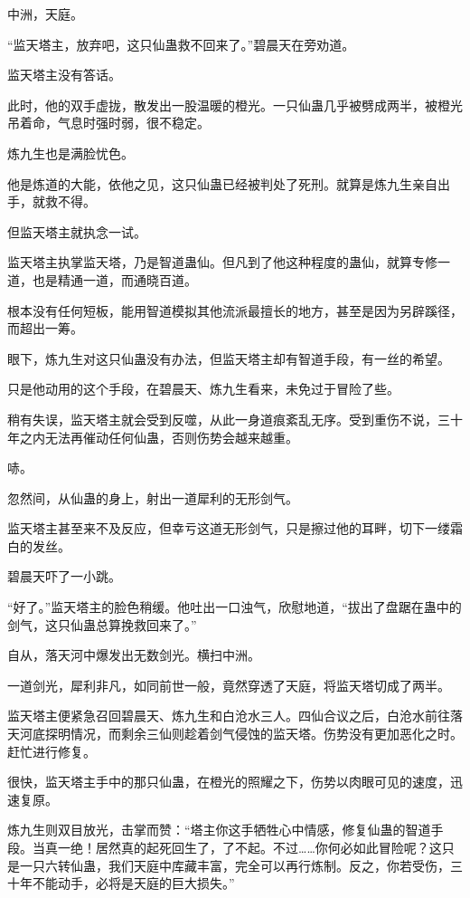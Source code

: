 
\begin{this_body}



中洲，天庭。

“监天塔主，放弃吧，这只仙蛊救不回来了。”碧晨天在旁劝道。

监天塔主没有答话。

此时，他的双手虚拢，散发出一股温暖的橙光。一只仙蛊几乎被劈成两半，被橙光吊着命，气息时强时弱，很不稳定。

炼九生也是满脸忧色。

他是炼道的大能，依他之见，这只仙蛊已经被判处了死刑。就算是炼九生亲自出手，就救不得。

但监天塔主就执念一试。

监天塔主执掌监天塔，乃是智道蛊仙。但凡到了他这种程度的蛊仙，就算专修一道，也是精通一道，而通晓百道。

根本没有任何短板，能用智道模拟其他流派最擅长的地方，甚至是因为另辟蹊径，而超出一筹。

眼下，炼九生对这只仙蛊没有办法，但监天塔主却有智道手段，有一丝的希望。

只是他动用的这个手段，在碧晨天、炼九生看来，未免过于冒险了些。

稍有失误，监天塔主就会受到反噬，从此一身道痕紊乱无序。受到重伤不说，三十年之内无法再催动任何仙蛊，否则伤势会越来越重。

哧。

忽然间，从仙蛊的身上，射出一道犀利的无形剑气。

监天塔主甚至来不及反应，但幸亏这道无形剑气，只是擦过他的耳畔，切下一缕霜白的发丝。

碧晨天吓了一小跳。

“好了。”监天塔主的脸色稍缓。他吐出一口浊气，欣慰地道，“拔出了盘踞在蛊中的剑气，这只仙蛊总算挽救回来了。”

自从，落天河中爆发出无数剑光。横扫中洲。

一道剑光，犀利非凡，如同前世一般，竟然穿透了天庭，将监天塔切成了两半。

监天塔主便紧急召回碧晨天、炼九生和白沧水三人。四仙合议之后，白沧水前往落天河底探明情况，而剩余三仙则趁着剑气侵蚀的监天塔。伤势没有更加恶化之时。赶忙进行修复。

很快，监天塔主手中的那只仙蛊，在橙光的照耀之下，伤势以肉眼可见的速度，迅速复原。

炼九生则双目放光，击掌而赞：“塔主你这手牺牲心中情感，修复仙蛊的智道手段。当真一绝！居然真的起死回生了，了不起。不过……你何必如此冒险呢？这只是一只六转仙蛊，我们天庭中库藏丰富，完全可以再行炼制。反之，你若受伤，三十年不能动手，必将是天庭的巨大损失。”


\end{this_body}
